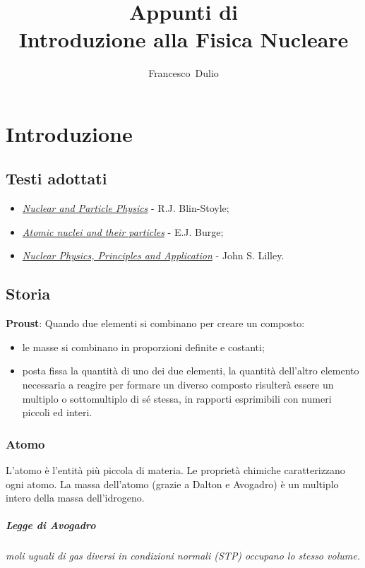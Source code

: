 \documentclass[a4paper,11pt,twoside,openany]{book}
\author{Francesco~Dulio}
\title{Appunti di \\Introduzione alla Fisica Nucleare}
\date{}
\theoremstyle{definition}
\theoremstyle{plain}
\theoremstyle{plain}
\theoremstyle{definition}
\begin{document}
\maketitle
\tableofcontents

\chapter{Introduzione}
\section{Testi adottati} %
\begin{itemize}
\item \emph{\href{http://www.amazon.it/Nuclear-Particle-Physics-R-Blin-Stoyle/dp/0412383209}{Nuclear and Particle Physics}} - R.J. Blin-Stoyle;
\item \emph{\href{http://www.amazon.com/Atomic-Nuclei-Particles-Oxford-Physics/dp/0198518722}{Atomic nuclei and their particles}} - E.J. Burge;
\item \emph{\href{http://www.amazon.it/Nuclear-Physics-Applications-John-Lilley/dp/0471979368}{Nuclear Physics, Principles and Application}} - John S. Lilley.
\end{itemize}

\section{Storia} %
\textbf{Proust}: Quando due elementi si combinano per creare un composto:
\begin{itemize}
\item le masse si combinano in proporzioni definite e costanti;
\item posta fissa la quantità di uno dei due elementi, la quantità dell'altro elemento necessaria a reagire per formare un diverso composto risulterà essere un multiplo o sottomultiplo di sé stessa, in rapporti esprimibili con numeri piccoli ed interi.
\end{itemize}

\subsection{Atomo} %
L'atomo è l'entità più piccola di materia. Le proprietà chimiche caratterizzano ogni atomo. La massa dell'atomo (grazie a Dalton e Avogadro) è un multiplo intero della massa dell'idrogeno.

\paragraph{Legge di Avogadro} \emph{moli uguali di gas diversi in condizioni normali (STP) occupano lo stesso volume.}
\end{document}
